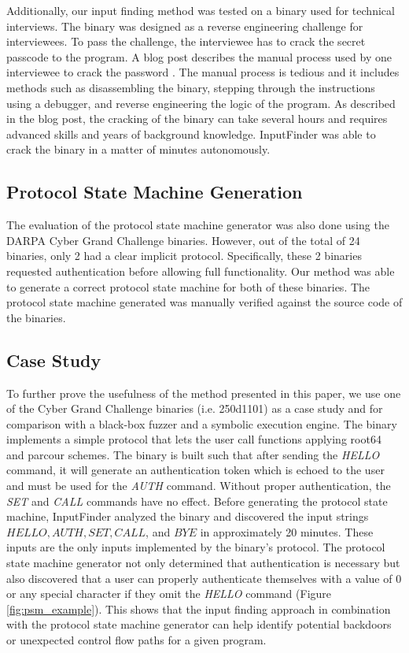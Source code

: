 \documentclass{sig-alternate-05-2015}
\def \tool {InputFinder}
\def \numbinaries {24}
\begin{document}
Additionally, our input finding method was tested on a binary used for technical interviews.
The binary was designed as a reverse engineering challenge for interviewees.
To pass the challenge, the interviewee has to crack the secret passcode to the program.
A blog post describes the manual process used by one interviewee to crack the password \cite{interviewbinary}.
The manual process is tedious and it includes methods such as disassembling the binary, stepping through the instructions using a debugger, and reverse engineering the logic of the program.
As described in the blog post, the cracking of the binary can take several hours and requires advanced skills and years of background knowledge.
\tool{} was able to crack the binary in a matter of minutes autonomously.

\subsection{Protocol State Machine Generation}
The evaluation of the protocol state machine generator was also done using the DARPA Cyber Grand Challenge binaries.
However, out of the total of \numbinaries{} binaries, only 2 had a clear implicit protocol.
Specifically, these 2 binaries requested authentication before allowing full functionality.
Our method was able to generate a correct protocol state machine for both of these binaries.
The protocol state machine generated was manually verified against the source code of the binaries.

\subsection{Case Study}
To further prove the usefulness of the method presented in this paper, we use one of the Cyber Grand Challenge binaries (i.e. 250d1101) as a case study and for comparison with a black-box fuzzer and a symbolic execution engine.
The binary implements a simple protocol that lets the user call functions applying root64 and parcour schemes.
The binary is built such that after sending the \textit{HELLO} command, it will generate an authentication token which is echoed to the user and must be used for the \textit{AUTH} command.
Without proper authentication, the \textit{SET} and \textit{CALL} commands have no effect.
Before generating the protocol state machine, \tool{} analyzed the binary and discovered the input strings $HELLO, AUTH, SET, CALL$, and $BYE$ in approximately 20 minutes.
These inputs are the only inputs implemented by the binary's protocol.
The protocol state machine generator not only determined that authentication is necessary but also discovered that a user can properly authenticate themselves with a value of 0 or any special character if they omit the \textit{HELLO} command (Figure \ref{fig:psm_example}).
This shows that the input finding approach in combination with the protocol state machine generator can help identify potential backdoors or unexpected control flow paths for a given program.
\end{document}
